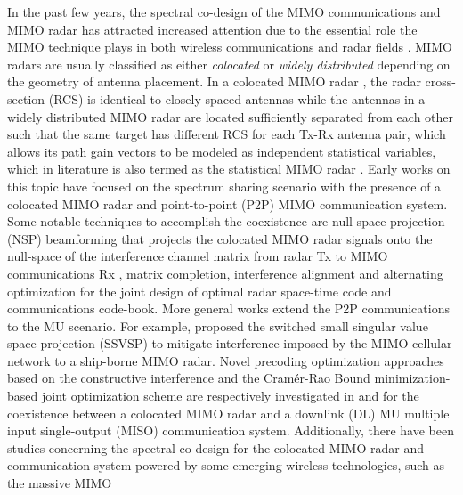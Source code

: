 \documentclass[9pt,journal]{IEEEtran}
\begin{document}
In the past few years, the spectral co-design of the MIMO communications and MIMO radar has attracted increased attention due to the essential role the MIMO technique plays in both wireless communications and radar fields \cite{MCMIMO_RadComm,qian2018joint,rihan2018optimum,liu2018mimo,MIMOCOMSecrecy,he2019performance,cheng2019miso}. 
MIMO radars 
are usually classified as either \textit{colocated} or \textit{widely distributed} depending on the geometry of antenna placement. In a colocated MIMO radar \cite{mishra2019cognitive}, the radar cross-section (RCS) is identical to closely-spaced antennas while the antennas in a widely distributed MIMO radar are located sufficiently separated from each other such that the same target has different RCS for each Tx-Rx antenna pair, which allows its path gain vectors to be modeled as independent statistical variables, which in literature is also termed as the statistical MIMO radar \cite{hongbin_movingtarget,Jammer_game,NaghshTSP2017,sun2019target}. 
Early works on this topic have focused on the spectrum sharing scenario with the presence of a colocated MIMO radar and point-to-point (P2P) MIMO communication system\cite{khawar2015target,MCMIMO_RadComm,qian2018joint,2019arXiv190707943G}. Some notable techniques to accomplish the coexistence are null space projection (NSP) beamforming that projects the colocated MIMO radar signals onto the null-space of the interference channel matrix from radar Tx to MIMO communications Rx \cite{khawar2015target}, matrix completion\cite{MCMIMO_RadComm}, interference alignment \cite{rihan2018optimum} and alternating optimization for the joint design of optimal radar space-time code and communications code-book\cite{qian2018joint}. More general works extend the P2P communications to the MU scenario. For example, \cite{mahal2017spectral} proposed the switched small singular value space projection (SSVSP) to mitigate interference imposed by the MIMO cellular network to a ship-borne MIMO radar. Novel precoding optimization approaches based on the constructive interference and the Cram\'er-Rao Bound minimization-based joint optimization scheme are respectively investigated in \cite{liu2018mu} and \cite{cheng2019miso} for the coexistence between a colocated MIMO radar and a downlink (DL) MU multiple input single-output (MISO) communication system. Additionally, there have been studies concerning the spectral co-design for the colocated MIMO radar and communication system powered by some emerging wireless technologies, such as the massive MIMO \cite{d2020uplink} %
\end{document}
